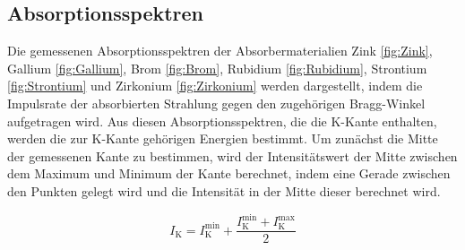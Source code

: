 \documentclass[titlepage = firstcover]{scrartcl}
\begin{document}
          
          \subsection{Absorptionsspektren}
            Die gemessenen Absorptionsspektren der Absorbermaterialien Zink \ref{fig:Zink}, Gallium \ref{fig:Gallium}, Brom \ref{fig:Brom}, Rubidium \ref{fig:Rubidium}, Strontium \ref{fig:Strontium}
            und Zirkonium \ref{fig:Zirkonium} werden dargestellt, indem die Impulsrate der absorbierten Strahlung gegen den zugehörigen Bragg-Winkel aufgetragen wird. 
            Aus diesen Absorptionsspektren, die die K-Kante enthalten, werden die zur K-Kante gehörigen Energien bestimmt. Um zunächst die Mitte der gemessenen Kante zu bestimmen, wird 
            der Intensitätswert der Mitte zwischen dem Maximum und Minimum der Kante berechnet, indem eine Gerade zwischen den Punkten gelegt wird und die Intensität in der Mitte dieser berechnet
            wird.
            
            \begin{equation}
              I_{\text{K}} = I_{\text{K}}^{\text{min}} + \frac{I_{\text{K}}^{\text{min}} + I_{\text{K}}^{\text{max}}}{2}
              \label{eqn:EFehler}
            \end{equation}
\end{document}
